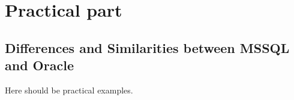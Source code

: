 \section{Practical part}

\subsection{Differences and Similarities between MSSQL and Oracle}

Here should be practical examples.



\clearpage